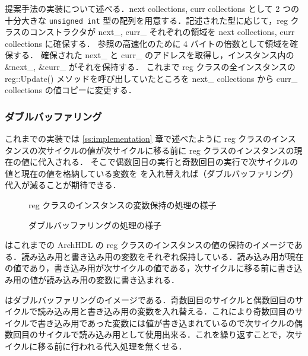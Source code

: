 提案手法の実装について述べる．next collections, curr collections として 2 つの十分大きな \verb/unsigned int/ 型の配列を用意する．記述された型に応じて，reg クラスのコンストラクタが next\_, curr\_ それぞれの領域を next collections, curr collections に確保する．
参照の高速化のために 4 バイトの倍数として領域を確保する．
確保された next\_ と curr\_ のアドレスを取得し，インスタンス内の \&next\_, \&curr\_ がそれを保持する．
これまで reg クラスの全インスタンスの reg::Update() メソッドを呼び出していたところを next\_ collections から curr\_ collections の値コピーに変更する．


\subsubsection{ダブルバッファリング}

これまでの実装では \ref{ss:implementation} 章で述べたように reg
クラスのインスタンスの次サイクルの値が次サイクルに移る前に reg
クラスのインスタンスの現在の値に代入される．
そこで偶数回目の実行と奇数回目の実行で次サイクルの値と現在の値を格納している変数を
を入れ替えれば（ダブルバッファリング）代入が減ることが期待できる．

\begin{figure}[t]
 \begin{center}
  
 \end{center}
 \caption{reg クラスのインスタンスの変数保持の処理の様子}
 \label{fig:reg_curr_next}
\end{figure}

\begin{figure}[t]
 \begin{center}
  
 \end{center}
 \caption{ダブルバッファリングの処理の様子}
 \label{fig:double_buffer}
\end{figure}

 はこれまでの ArchHDL の reg
クラスのインスタンスの値の保持のイメージである．読み込み用と書き込み用の変数をそれぞれ保持している．読み込み用が現在の値であり，書き込み用が次サイクルの値である，次サイクルに移る前に書き込み用の値が読み込み用の変数に書き込まれる．

はダブルバッファリングのイメージである．奇数回目のサイクルと偶数回目のサイクルで読み込み用と書き込み用の変数を入れ替える．これにより奇数回目のサイクルで書き込み用であった変数には値が書き込まれているので次サイクルの偶数回目のサイクルで読み込み用として使用出来る．これを繰り返すことで，次サイクルに移る前に行われる代入処理を無くせる．

